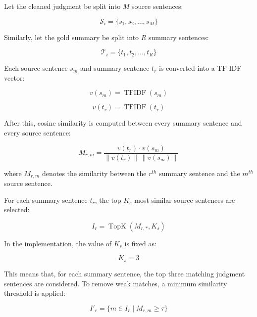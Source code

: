 \documentclass[11pt, a4paper]{article}
\theoremstyle{plain}%
\theoremstyle{remark}%
\theoremstyle{definition}%
\begin{document}
Let the cleaned judgment be split into \(M\) source sentences:

\begin{equation}
\mathcal{S}_i=\{s_1,s_2,\ldots,s_M\}
\end{equation}

Similarly, let the gold summary be split into \(R\) summary sentences:

\begin{equation}
\mathcal{T}_i=\{t_1,t_2,\ldots,t_R\}
\end{equation}

Each source sentence \(s_m\) and summary sentence \(t_r\) is converted into a TF-IDF vector:

\begin{equation}
v(s_m)=\operatorname{TFIDF}(s_m)
\end{equation}

\begin{equation}
v(t_r)=\operatorname{TFIDF}(t_r)
\end{equation}

After this, cosine similarity is computed between every summary sentence and every source sentence:

\begin{equation}
M_{r,m}=
\frac{v(t_r)\cdot v(s_m)}
{\lVert v(t_r)\rVert \, \lVert v(s_m)\rVert}
\end{equation}

where \(M_{r,m}\) denotes the similarity between the \(r^{th}\) summary sentence and the \(m^{th}\) source sentence.

For each summary sentence \(t_r\), the top \(K_s\) most similar source sentences are selected:

\begin{equation}
I_r=\operatorname{TopK}(M_{r,*},K_s)
\end{equation}

In the implementation, the value of \(K_s\) is fixed as:

\begin{equation}
K_s=3
\end{equation}

This means that, for each summary sentence, the top three matching judgment sentences are considered. To remove weak matches, a minimum similarity threshold is applied:

\begin{equation}
I'_r=\{m\in I_r \mid M_{r,m}\geq \tau\}
\end{equation}
\end{document}
